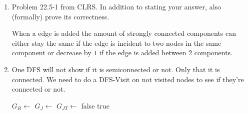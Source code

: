 \documentclass[letterpaper,11pt]{article}
\begin{document}
\begin{enumerate}
\item Problem 22.5-1 from CLRS. In addition to stating your answer, also (formally) prove its correctness.

When a edge is added the amount of strongly connected components can either stay the same if the edge is incident to two nodes in the same component or decrease by $1$ if the edge is added between $2$ components.
 
\item 
One DFS will not show if it is semiconnected or not. Only that it is connected. We need to do a DFS-Visit on not visited nodes to see if they're connected or not.

\begin{algorithm}
\begin{algorithmic}[1]
\State $G_R \gets$ 
\State $G_J \gets$ 
\State $G_{JT} \gets$ 
\State {}
\State {}
\State \Return false
\EndIf
\EndFor
\State \Return true
\EndFunction
\end{algorithmic}
\end{algorithm}

\end{enumerate}
\end{document}
